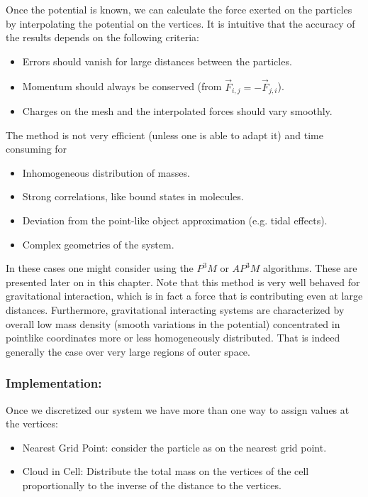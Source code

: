 \noindent
Once the potential is known, we can calculate the force exerted on the particles by interpolating the potential on the vertices. It is intuitive that the accuracy of the results depends on the following criteria:
\begin{itemize}
\item Errors should vanish for large distances between the particles.
\item Momentum should always be conserved (from $\vec{F}_{i,j}=-\vec{F}_{j,i}$).
\item Charges on the mesh and the interpolated forces should vary smoothly.
\end{itemize}
The method is not very efficient (unless one is able to adapt it) and time consuming for
\begin{itemize}
\item Inhomogeneous distribution of masses.
\item Strong correlations, like bound states in molecules.
\item Deviation from the point-like object approximation (e.g. tidal effects).
\item Complex geometries of the system.
\end{itemize} 
In these cases one might consider using the $P^3M$ or $AP^3M$ algorithms. These are presented later on in this chapter. Note that this method is very well behaved for gravitational interaction, which is in fact a force that is contributing even at large distances. Furthermore, gravitational interacting systems are characterized by overall low mass density (smooth variations in the potential) concentrated in pointlike coordinates more or less homogeneously distributed. That is indeed generally the case over very large regions of outer space. 

\subsubsection*{Implementation:}
Once we discretized our system we have more than one way to assign values at the vertices:

\begin{itemize}
\item Nearest Grid Point: consider the particle as on the nearest grid point.
\item Cloud in Cell: Distribute the total mass on the vertices of the cell proportionally to the inverse of the distance to the vertices.
\end{itemize}

